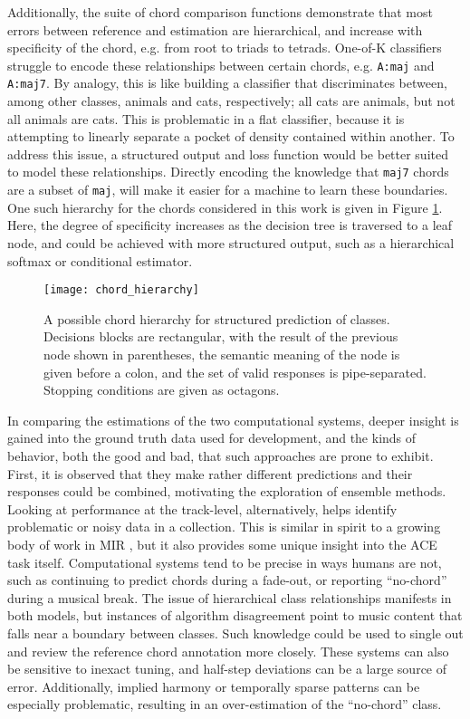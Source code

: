 Additionally, the suite of chord comparison functions demonstrate that most errors between reference and estimation are hierarchical, and increase with specificity of the chord, e.g. from root to triads to tetrads.
One-of-K classifiers struggle to encode these relationships between certain chords, e.g. \texttt{A:maj} and \texttt{A:maj7}.
By analogy, this is like building a classifier that discriminates between, among other classes, animals and cats, respectively; all cats are animals, but not all animals are cats.
This is problematic in a flat classifier, because it is attempting to linearly separate a pocket of density contained within another.
To address this issue, a structured output and loss function would be better suited to model these relationships.
Directly encoding the knowledge that \texttt{maj7} chords are a subset of \texttt{maj}, will make it easier for a machine to learn these boundaries.
One such hierarchy for the chords considered in this work is given in Figure \ref{fig:chord_hierarchy}.
Here, the degree of specificity increases as the decision tree is traversed to a leaf node, and could be achieved with more structured output, such as a hierarchical softmax or conditional estimator.


\begin{figure}[t!]
\centering
\texttt{[image: chord\_hierarchy]}
\caption{A possible chord hierarchy for structured prediction of classes. Decisions blocks are rectangular, with the result of the previous node shown in parentheses, the semantic meaning of the node is given before a colon, and the set of valid responses is pipe-separated. Stopping conditions are given as octagons.}
\label{fig:chord_hierarchy}
\end{figure}


In comparing the estimations of the two computational systems, deeper insight is gained into the ground truth data used for development, and the kinds of behavior, both the good and bad, that such approaches are prone to exhibit.
First, it is observed that they make rather different predictions and their responses could be combined, motivating the exploration of ensemble methods.
Looking at performance at the track-level, alternatively, helps identify problematic or noisy data in a collection.
This is similar in spirit to a growing body of work in MIR \cite{Holzapfel}, but it also provides some unique insight into the ACE task itself.
Computational systems tend to be precise in ways humans are not, such as continuing to predict chords during a fade-out, or reporting ``no-chord'' during a musical break.
The issue of hierarchical class relationships manifests in both models, but instances of algorithm disagreement point to music content that falls near a boundary between classes.
Such knowledge could be used to single out and review the reference chord annotation more closely.
These systems can also be sensitive to inexact tuning, and half-step deviations can be a large source of error.
Additionally, implied harmony or temporally sparse patterns can be especially problematic, resulting in an over-estimation of the ``no-chord'' class.


